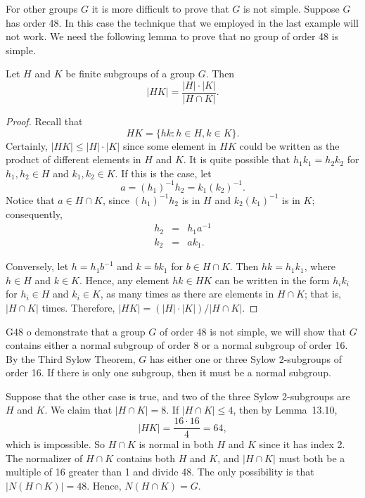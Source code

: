  

 
 
For other groups $G$ it is more difficult to prove that $G$ is not
simple. Suppose $G$ has order 48. In this case the technique that we
employed in the last example will not work.  We need the following
lemma to prove that no group of order 48 is simple.  
 
 
\begin{lemma}
Let $H$ and $K$ be finite subgroups of a group $G$. Then
\[
|HK| = \frac{|H| \cdot |K|}{|H \cap K|}.
\]
\end{lemma}
 
 
\begin{proof}
Recall that
\[
HK = \{ hk : h \in H, k \in K \}.
\]
Certainly, $|HK| \leq |H| \cdot |K|$ since some element in $HK$
could be written as the product of different elements in $H$ and $K$.
It is quite possible that $h_1 k_1 = h_2 k_2$ for $h_1, h_2 \in H$ and
$k_1, k_2 \in K$.  If this is the case, let
\[
a = (h_1)^{-1} h_2 = k_1 (k_2)^{-1}.
\]
Notice that $a \in H \cap K$, since $(h_1)^{-1} h_2$ is in $H$ and
$k_2 (k_1)^{-1}$ is in $K$; consequently, 
\begin{eqnarray*}
h_2 & = & h_1 a^{-1} \\
k_2 & = & a k_1.
\end{eqnarray*}
 
 
Conversely, let $h = h_1 b^{-1}$ and $k = b k_1$ for $b \in  H
\cap K$. Then $h k = h_1 k_1$, where $h \in H$ and $k \in K$. Hence,
any element $hk \in HK$ can be written in the form $h_i k_i$ for $h_i
\in H$ and $k_i \in K$, as many times as there are elements in $H
\cap K$; that is, $|H \cap K|$ times. Therefore, $|HK| = (|H| \cdot
|K|)/|H \cap K|$. 
\mbox{\hspace*{1in}}
\end{proof}
 
 
 
\begin{example}{G48}
o demonstrate that a group $G$ of order 48 is not simple, we will
show that $G$ contains either a normal subgroup of order 8 or a normal
subgroup of order 16.  By the Third Sylow Theorem, $G$ has either one
or three Sylow 2-subgroups of order 16.  If there is only one
subgroup, then it must be a normal subgroup. 
 
 
Suppose that the other case is true, and two of the three Sylow
2-subgroups are $H$ and $K$. We claim that  $|H \cap K| = 8$.  If $|H
\cap K| \leq 4$, then by Lemma~13.10, 
\[
|HK| = \frac{16 \cdot 16}{4} =64,
\]
which is impossible.  So $H \cap K$ is normal in both $H$ and $K$
since it has index 2. The normalizer of $H \cap K$ contains both $H$
and $K$, and $|H \cap K|$ must both be a multiple of 16 greater than
1 and divide 48. The only possibility is that $|N(H \cap K)|= 48$.
Hence, $N(H \cap K) = G$.
\end{example}
 
